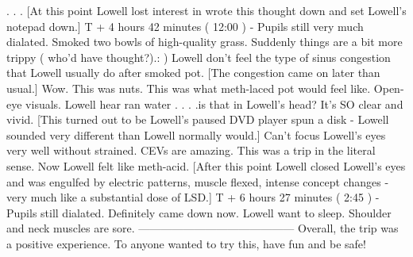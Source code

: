 \documentclass[12pt]{book}
\begin{document}
. . .  [At this point Lowell lost interest in wrote this thought down and set Lowell's notepad down.] T + 4 hours 42 minutes ( 12:00 ) - Pupils still very much dialated. Smoked two bowls of high-quality grass. Suddenly things are a bit more trippy ( who'd have thought?).: ) Lowell don't feel the type of sinus congestion that Lowell usually do after smoked pot. [The congestion came on later than usual.] Wow. This was nuts. This was what meth-laced pot would feel like. Open-eye visuals. Lowell hear ran water . . .  .is that in Lowell's head? It's SO clear and vivid. [This turned out to be Lowell's paused DVD player spun a disk - Lowell sounded very different than Lowell normally would.] Can't focus Lowell's eyes very well without strained. CEVs are amazing. This was a trip in the literal sense. Now Lowell felt like meth-acid. [After this point Lowell closed Lowell's eyes and was engulfed by electric patterns, muscle flexed, intense concept changes - very much like a substantial dose of LSD.] T + 6 hours 27 minutes ( 2:45 ) - Pupils still dialated. Definitely came down now. Lowell want to sleep. Shoulder and neck muscles are sore. ------------------------------------------ Overall, the trip was a positive experience. To anyone wanted to try this, have fun and be safe!
\end{document}
